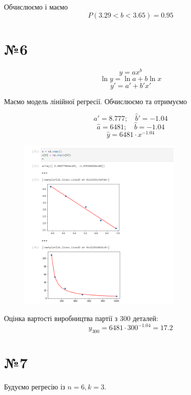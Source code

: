 \documentclass[11pt, a4paper]{article} %
\begin{document}
Обчислюємо і маємо
$$P(3.29 < b < 3.65) = 0.95$$

\pagebreak
\section*{№6}

$$y = ax^b$$
$$\ln y = \ln a + b \ln x$$
$$y' = a' + b' x'$$

Маємо модель лінійної регресії.
Обчислюємо та отримуємо

$$\hat a' = 8.777; \quad \hat b' = -1.04$$
$$\hat a = 6481; \quad \hat b = -1.04$$
$$\hat y = 6481 \cdot x ^ {-1.04}$$

\begin{figure}[h]
    \centering
    \includegraphics[width=0.7\textwidth]{task6.png}
\end{figure}

Оцінка вартості виробництва партії з 300 деталей:
$$y_{300} = 6481 \cdot 300 ^ {-1.04} = 17.2$$

\pagebreak

\section*{№7}

Будуємо регресію із $n=6, k=3$.
\end{document}
